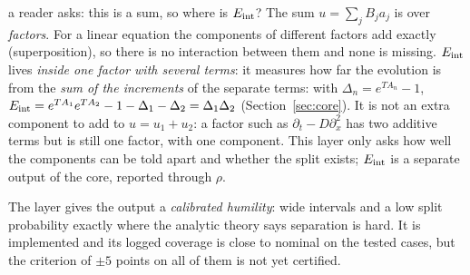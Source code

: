 \begin{explained}{a reader asks: this is a sum, so where is $E_{\mathrm{int}}$?}
The sum $u=\sum_jB_ja_j$ is over \emph{factors}. For a linear equation the components of different factors add exactly (superposition), so there is no interaction between them and none is missing. $E_{\mathrm{int}}$ lives \emph{inside one factor with several terms}: it measures how far the evolution is from the \emph{sum of the increments} of the separate terms: with $\Delta_n=e^{TA_n}-1$, $E_{\mathrm{int}}=e^{TA_1}e^{TA_2}-1-\Delta_1-\Delta_2=\Delta_1\Delta_2$ (Section~\ref{sec:core}). It is not an extra component to add to $u=u_1+u_2$: a factor such as $\partial_t-D\partial_x^2$ has two additive terms but is still one factor, with one component. This layer only asks how well the components can be told apart and whether the split exists; $E_{\mathrm{int}}$ is a separate output of the core, reported through $\rho$.
\end{explained}

\begin{takeaway}
The layer gives the output a \emph{calibrated humility}: wide intervals and a low split probability exactly where the analytic theory says separation is hard. It is implemented and its logged coverage is close to nominal on the tested cases, but the criterion of $\pm5$ points on all of them is not yet certified.
\end{takeaway}
